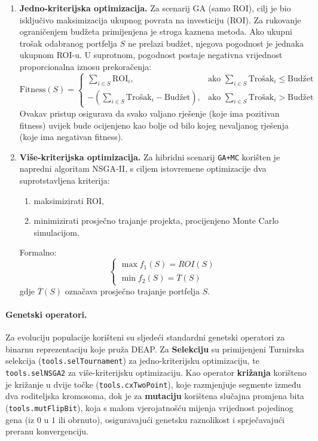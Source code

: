 \begin{enumerate}
    \item \textbf{Jedno-kriterijska optimizacija.}  
Za scenarij GA (samo ROI), cilj je bio isključivo maksimizacija ukupnog povrata na investiciju (ROI). Za rukovanje ograničenjem budžeta primijenjena je stroga kaznena metoda. Ako ukupni trošak odabranog portfelja $S$ ne prelazi budžet, njegova pogodnost je jednaka ukupnom ROI-u. U suprotnom, pogodnost postaje negativna vrijednost proporcionalna iznosu prekoračenja:
$$
\text{Fitness}(S) = 
\begin{cases}
    \sum_{i \in S} \text{ROI}_i, & \text{ako } \sum_{i \in S} \text{Trošak}_i \leq \text{Budžet} \\
    -\left(\sum_{i \in S} \text{Trošak}_i - \text{Budžet}\right), & \text{ako } \sum_{i \in S} \text{Trošak}_i > \text{Budžet}
\end{cases}
$$
Ovakav pristup osigurava da svako valjano rješenje (koje ima pozitivan fitness) uvijek bude ocijenjeno kao bolje od bilo kojeg nevaljanog rješenja (koje ima negativan fitness).    \item \textbf{Više-kriterijska optimizacija.}  
    Za hibridni scenarij \texttt{GA+MC} korišten je napredni algoritam NSGA-II, s ciljem istovremene optimizacije dva suprotstavljena kriterija:
    \begin{enumerate}
        \item maksimizirati ROI,
        \item minimizirati prosječno trajanje projekta, procijenjeno Monte Carlo simulacijom.
    \end{enumerate}
    Formalno:
    \[
    \begin{cases}
    \max f_1(S) = ROI(S) \\
    \min f_2(S) = \overline{T}(S)
    \end{cases}
    \]
    gdje $\overline{T}(S)$ označava prosječno trajanje portfelja $S$.
\end{enumerate}

\paragraph{Genetski operatori.}
Za evoluciju populacije korišteni su sljedeći standardni genetski operatori za binarnu reprezentaciju koje pruža DEAP. Za \textbf{Selekciju} su primijenjeni Turnirska selekcija (\texttt{tools.selTournament}) za jedno-kriterijsku optimizaciju, te \texttt{tools.selNSGA2} za više-kriterijsku optimizaciju. Kao operator \textbf{križanja} korišteno je križanje u dvije točke (\texttt{tools.cxTwoPoint}), koje razmjenjuje segmente između dva roditeljska kromosoma, dok je za \textbf{mutaciju} korištena slučajna promjena bita (\texttt{tools.mutFlipBit}), koja s malom vjerojatnošću mijenja vrijednost pojedinog gena (iz $0$ u $1$ ili obrnuto), osiguravajući genetsku raznolikost i sprječavajući preranu konvergenciju.

